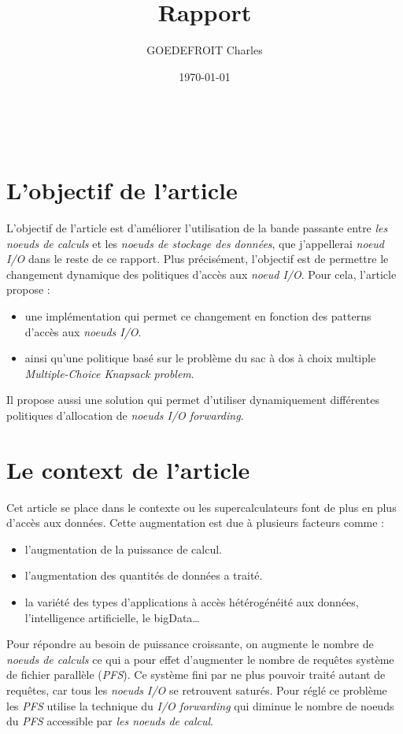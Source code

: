 \documentclass[10pt, a4paper]{article}
\title{Rapport}
\author{GOEDEFROIT Charles}
\date{\today}
\begin{document}
\begin{titlepage}
	\centering
  \ {} %
	\vfill
	\vspace{1cm}
	{\scshape\Huge\MyTitle\par}
	\vspace{0.5cm}
	{\Large\MySubject\par}
	\vspace{1cm}
	\MyAuthor
	\vfill
	{\large\MyDate\par}
\end{titlepage}

\newpage


\section{L'objectif de l'article}

L'objectif de l'article est d'améliorer l'utilisation de la bande passante entre \emph{les noeuds de calculs} et les \emph{noeuds de stockage des données}, que j'appellerai \emph{noeud I/O} dans le reste de ce rapport. Plus précisément, l'objectif est de permettre le changement dynamique des politiques d'accès aux \emph{noeud I/O}. Pour cela, l'article propose :
\begin{itemize}
  \item une implémentation qui permet ce changement en fonction des patterns d'accès aux \emph{noeuds I/O}.
  \item ainsi qu'une politique basé sur le problème du sac à dos à choix multiple \emph{Multiple-Choice Knapsack problem}.
\end{itemize}

Il propose aussi une solution qui permet d'utiliser dynamiquement différentes politiques d'allocation de \emph{noeuds I/O forwarding}.

\section{Le context de l'article}

Cet article se place dans le contexte ou les supercalculateurs font de plus en
plus d'accès aux données. Cette augmentation est due à plusieurs facteurs comme :
\begin{itemize}
  \item l'augmentation de la puissance de calcul.
  \item l'augmentation des quantités de données a traité.
  \item la variété des types d'applications à accès hétérogénéité aux données, l'intelligence artificielle, le bigData\dots
\end{itemize}
Pour répondre au besoin de puissance croissante, on augmente le nombre de \emph{noeuds de calculs} ce qui a pour effet d'augmenter le nombre de requêtes système de fichier parallèle (\emph{PFS}). Ce système fini par ne plus pouvoir traité autant de requêtes, car tous les \emph{noeuds I/O} se retrouvent saturés. Pour réglé ce problème les \emph{PFS} utilise la technique du \emph{I/O forwarding} qui diminue le nombre de noeuds du \emph{PFS} accessible par \emph{les noeuds de calcul}.
\end{document}
